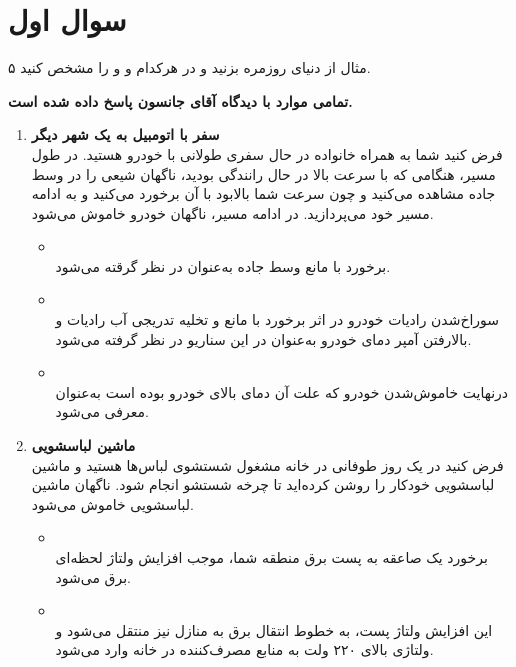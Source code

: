 \section{سوال اول}

۵ مثال از دنیای روزمره بزنید و در هرکدام  و  و  را مشخص کنید.

\begin{qsolve}[]
	\textbf{تمامی موارد با دیدگاه آقای جانسون پاسخ داده شده است.}
	\begin{enumerate}
		\item 
		\textbf{سفر با اتومبیل به یک شهر دیگر}\\
		فرض کنید شما به همراه خانواده در حال سفری طولانی با خودرو هستید. در طول مسیر، هنگامی که با سرعت بالا در حال رانندگی بودید، ناگهان شیعی را در وسط جاده مشاهده می‌کنید و چون سرعت شما بالابود با آن برخورد می‌کنید و به ادامه مسیر خود می‌پردازید. در ادامه مسیر، ناگهان خودرو خاموش می‌شود.
		\begin{itemize}
			\item {}\\
			برخورد با مانع وسط جاده به‌عنوان  در نظر گرقته می‌شود.

			\item {}\\
			سوراخ‌شدن رادیات خودرو در اثر برخورد با مانع و تخلیه تدریجی آب رادیات و بالارفتن آمپر دمای خودرو به‌عنوان  در این سناریو در نظر گرفته می‌شود.
			
			\item {}\\
			درنهایت خاموش‌شدن خودرو که علت آن دمای بالای خودرو بوده است به‌عنوان  معرفی می‌شود.
		\end{itemize}
		
		
		\item 
		\textbf{ماشین لباسشویی}\\
		فرض کنید در یک روز طوفانی در خانه مشغول شستشوی لباس‌ها هستید و ماشین لباسشویی خودکار را روشن کرده‌اید تا چرخه شستشو انجام شود. ناگهان ماشین لباسشویی خاموش می‌شود.
		
		\begin{itemize}
			\item {}\\
			برخورد یک صاعقه به پست برق منطقه شما، موجب افزایش ولتاژ لحظه‌ای برق می‌شود.
			
			\item {}\\
			این افزایش ولتاژ پست، به خطوط انتقال برق به منازل نیز منتقل می‌شود و ولتاژی بالای ۲۲۰ ولت به منابع مصرف‌کننده در خانه وارد می‌شود.
			

\end{itemize}
\end{enumerate}
\end{qsolve}
